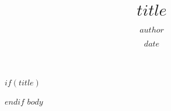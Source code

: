 \documentclass[11pt,a4paper]{article}
\begin{document}
$if(title)$
\title{$title$}
\author{$author$}
\date{$date$}
\maketitle
$endif$
$body$
\end{document}
